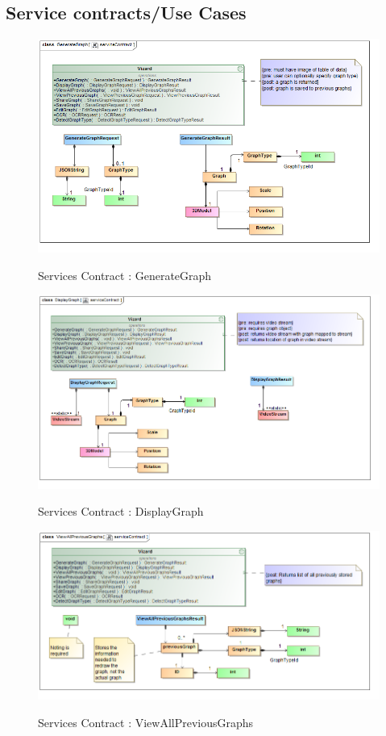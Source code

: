 \documentclass[a4paper,12pt]{article}
\begin{document}
\subsection{Service contracts/Use Cases}
	\begin{figure}[H]
		\includegraphics[width=\textwidth]{Images/class__GenerateGraph__serviceContract.png}  \\
		\caption{Services Contract : GenerateGraph}
	\end{figure}
	\begin{figure}[H]
		\includegraphics[width=\textwidth]{Images/class__DisplayGraph__serviceContract.png}  \\
		\caption{Services Contract : DisplayGraph}
	\end{figure}
	\begin{figure}[H]
		\includegraphics[width=\textwidth]{Images/class__ViewAllPreviousGraphs__serviceContract.png}  \\
		\caption{Services Contract : ViewAllPreviousGraphs}
	\end{figure}
	
\end{document}
